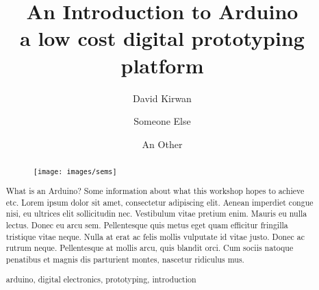 \documentclass[runningheads,a4paper]{llncs}
\newcommand{\keywords}[1]{\par\addvspace\baselineskip
\noindent\keywordname\enspace\ignorespaces#1}
\begin{document}
\mainmatter  %

\title{An Introduction to Arduino \\a low cost digital prototyping platform}

%

%
%
\author{David Kirwan%
\and Someone Else \and An Other}
%

%

%
%
\maketitle

%
\begin{abstract}
\begin{figure}
	\centering
	\texttt{[image: images/sems]}
\end{figure}
What is an Arduino? Some information about what this workshop hopes to achieve etc. Lorem ipsum dolor sit amet, consectetur adipiscing elit. Aenean imperdiet congue nisi, eu ultrices elit sollicitudin nec. Vestibulum vitae pretium enim. Mauris eu nulla lectus. Donec eu arcu sem. Pellentesque quis metus eget quam efficitur fringilla tristique vitae neque. Nulla at erat ac felis mollis vulputate id vitae justo. Donec ac rutrum neque. Pellentesque at mollis arcu, quis blandit orci. Cum sociis natoque penatibus et magnis dis parturient montes, nascetur ridiculus mus.
\keywords{arduino, digital electronics, prototyping, introduction}
\end{abstract}
%
\end{document}
